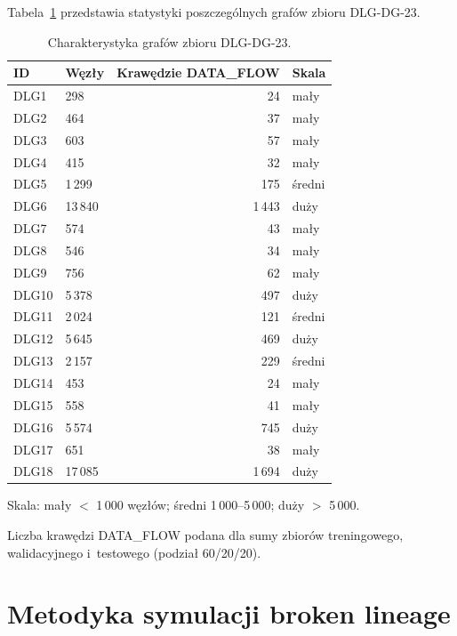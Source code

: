 Tabela~\ref{tab:dlg-stats} przedstawia statystyki poszczególnych
grafów zbioru DLG-DG-23.

\begin{table}[ht]
\centering
\caption{Charakterystyka grafów zbioru DLG-DG-23.}
\label{tab:dlg-stats}
\begin{threeparttable}
\begin{tabular}{llrl}
\toprule
\textbf{ID} & \textbf{Węzły} & \textbf{Krawędzie DATA\_FLOW} & \textbf{Skala} \\
\midrule
DLG1  &    298 &    24 & mały   \\
DLG2  &    464 &    37 & mały   \\
DLG3  &    603 &    57 & mały   \\
DLG4  &    415 &    32 & mały   \\
DLG5  & 1\,299 &   175 & średni \\
DLG6  & 13\,840 & 1\,443 & duży  \\
DLG7  &    574 &    43 & mały   \\
DLG8  &    546 &    34 & mały   \\
DLG9  &    756 &    62 & mały   \\
DLG10 & 5\,378 &   497 & duży   \\
DLG11 & 2\,024 &   121 & średni \\
DLG12 & 5\,645 &   469 & duży   \\
DLG13 & 2\,157 &   229 & średni \\
DLG14 &    453 &    24 & mały   \\
DLG15 &    558 &    41 & mały   \\
DLG16 & 5\,574 &   745 & duży   \\
DLG17 &    651 &    38 & mały   \\
DLG18 & 17\,085 & 1\,694 & duży \\
\bottomrule
\end{tabular}
\begin{tablenotes}
\small
\item Skala: mały $<$ 1\,000 węzłów; średni 1\,000–5\,000; duży $>$ 5\,000.
\item Liczba krawędzi DATA\_FLOW podana dla sumy zbiorów treningowego,
      walidacyjnego i~testowego (podział 60/20/20).
\end{tablenotes}
\end{threeparttable}
\end{table}

\section{Metodyka symulacji broken lineage}
\label{sec:scenariusze}

